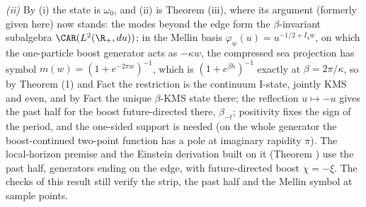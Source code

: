 \emph{(ii)} By (i) the state is $\omega_{0}$, and (ii) is Theorem (iii), where its argument (formerly given here) now stands: the modes beyond the edge form the $\beta$-invariant subalgebra $\CAR(L^{2}(\R_{+}, du))$; in the Mellin basis $\varphi_{w}(u) = u^{-1/2 + I_{4}w}$, on which the one-particle boost generator acts as $-\kappa w$, the compressed sea projection has symbol $m(w) = (1 + e^{-2\pi w})^{-1}$, which is $(1 + e^{\beta h})^{-1}$ exactly at $\beta = 2\pi/\kappa$, so by Theorem (1) and Fact  the restriction is the continuum I-state, jointly KMS and even, and by Fact  the unique $\beta$-KMS state there; the reflection $u \mapsto -u$ gives the past half for the boost future-directed there, $\beta_{-t}$; positivity fixes the sign of the period, and the one-sided support is needed (on the whole generator the boost-continued two-point function has a pole at imaginary rapidity $\pi$). The local-horizon premise and the Einstein derivation built on it (Theorem ) use the past half, generators ending on the edge, with future-directed boost $\chi = -\xi$. The checks of this result still verify the strip, the past half and the Mellin symbol at sample points.

